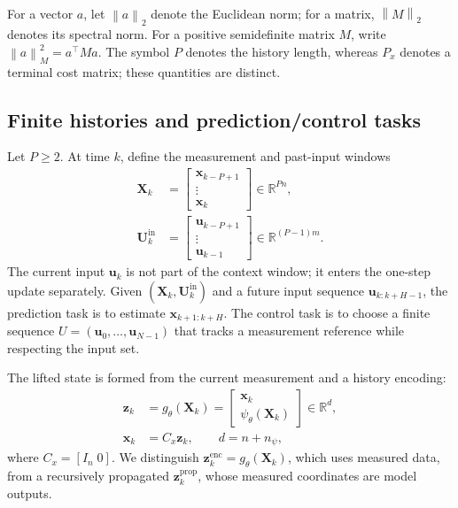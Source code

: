 \documentclass[journal]{IEEEtran}
\newcommand{\vx}{\mathbf{x}}
\newcommand{\vu}{\mathbf{u}}
\newcommand{\vz}{\mathbf{z}}
\newcommand{\mU}{\mathbf{U}}
\newcommand{\mX}{\mathbf{X}}
\newcommand{\R}{\mathbb{R}}
\newcommand{\norm}[1]{\left\lVert #1\right\rVert}
\begin{document}
For a vector $a$, let $\norm{a}_2$ denote the Euclidean norm; for a matrix, $\norm{M}_2$ denotes its spectral norm. For a positive semidefinite matrix $M$, write $\norm{a}_M^2=a^\top M a$. The symbol $P$ denotes the history length, whereas $P_x$ denotes a terminal cost matrix; these quantities are distinct.

\subsection{Finite histories and prediction/control tasks}

Let $P\ge2$. At time $k$, define the measurement and past-input windows
\begin{align}
    \mX_k&=\begin{bmatrix}\vx_{k-P+1}\\ \vdots\\ \vx_k\end{bmatrix}\in\R^{Pn},
    \label{eq:measurement_window}\\
    \mU_k^{\mathrm{in}}&=\begin{bmatrix}\vu_{k-P+1}\\ \vdots\\ \vu_{k-1}\end{bmatrix}\in\R^{(P-1)m}.
    \label{eq:history_windows}
\end{align}
The current input $\vu_k$ is not part of the context window; it enters the one-step update separately. Given $(\mX_k,\mU_k^{\mathrm{in}})$ and a future input sequence $\vu_{k:k+H-1}$, the prediction task is to estimate $\vx_{k+1:k+H}$. The control task is to choose a finite sequence $U=(\vu_0,\ldots,\vu_{N-1})$ that tracks a measurement reference while respecting the input set.

The lifted state is formed from the current measurement and a history encoding:
\begin{align}
    \vz_k&=g_\theta(\mX_k)=\begin{bmatrix}\vx_k\\ \psi_\theta(\mX_k)\end{bmatrix}\in\R^d,
    \label{eq:state_preserving_lifting}\\
    \vx_k&=C_x\vz_k,\qquad d=n+n_\psi,
    \label{eq:state_readout}
\end{align}
where $C_x=[I_n\;0]$. We distinguish $\vz_k^{\mathrm{enc}}=g_\theta(\mX_k)$, which uses measured data, from a recursively propagated $\vz_k^{\mathrm{prop}}$, whose measured coordinates are model outputs.
\end{document}
